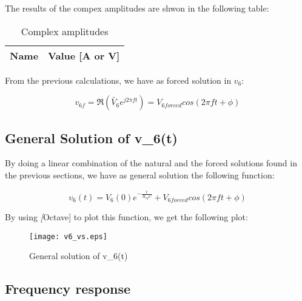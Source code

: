 \hfill


The results of the compex amplitudes are shwon in the following table:

\begin{table}[b]
  \centering
  \begin{tabular}{|l|r|}
    \hline
    {\bf Name} & {\bf Value [A or V]} \\ \hline
    
  \end{tabular}
  \caption{Complex amplitudes}
  \label{tab:op_tabNodal}
\end{table}


From the previous calculations, we have as forced solution in $v_6$:

\begin{equation}
  v_{6f} = \Re (\tilde{V_6} e^{j 2\pi f t}) = V_{6forced} cos(2 \pi f t + \phi)
  \label{forcedSolution}
\end{equation}


\subsection{General Solution of v_6(t)}

By doing a linear combination of the natural and the forced solutions found in the previous sections, we have as general solution the following function:

\begin{equation}
  v_6(t) = V _6(0)e^{-\frac{t}{R_{eq}C}} + V_{6forced} cos(2 \pi f t + \phi)
  \label{finalSolution}
\end{equation}

By using \textit[Octave] to plot this function, we get the following plot:

\begin{figure}[h] \centering
  \texttt{[image: v6\_vs.eps]}
  \caption{General solution of v_6(t) }
  \label{fig:finalSolution}
\end{figure}



\subsection{Frequency response}



